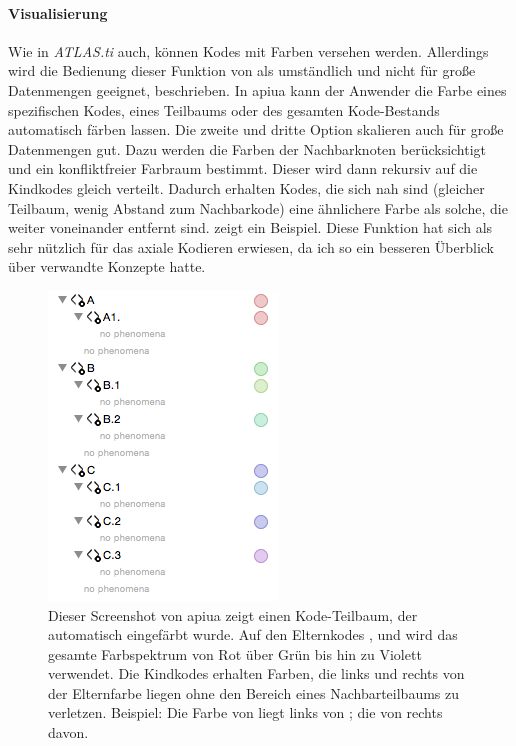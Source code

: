 \paragraph{Visualisierung}
Wie in \textit{ATLAS.ti} auch, können Kodes mit Farben versehen werden. Allerdings wird die Bedienung dieser Funktion von \cite{Zieris:yCXyxVc9} als umständlich und nicht für große Datenmengen geeignet, beschrieben. In \gls{apiua} kann der Anwender die Farbe eines spezifischen Kodes, eines Teilbaums oder des gesamten Kode-Bestands automatisch färben lassen. Die zweite und dritte Option skalieren auch für große Datenmengen gut. Dazu werden die Farben der Nachbarknoten berücksichtigt und ein konfliktfreier Farbraum bestimmt. Dieser wird dann rekursiv auf die Kindkodes gleich verteilt. Dadurch erhalten Kodes, die sich nah sind (gleicher Teilbaum, wenig Abstand zum Nachbarkode) eine ähnlichere Farbe als solche, die weiter voneinander entfernt sind.  zeigt ein Beispiel. Diese Funktion hat sich als sehr nützlich für das axiale Kodieren erwiesen, da ich so ein besseren Überblick über verwandte Konzepte hatte.

\begin{figure}
  \centering
    \includegraphics[width=0.4\linewidth]{Figures/apiua/colors.png}
  \caption[APIUA: Gruppendiskussion]{Dieser Screenshot von \gls{apiua} zeigt einen Kode-Teilbaum, der automatisch eingefärbt wurde. Auf den Elternkodes ,  und  wird das gesamte Farbspektrum von Rot über Grün bis hin zu Violett verwendet. Die Kindkodes erhalten Farben, die links und rechts von der Elternfarbe liegen ohne den Bereich eines Nachbarteilbaums zu verletzen. Beispiel: Die Farbe von  liegt links von ; die von  rechts davon.}
  \label{fig:apiua-colors}
\end{figure}

